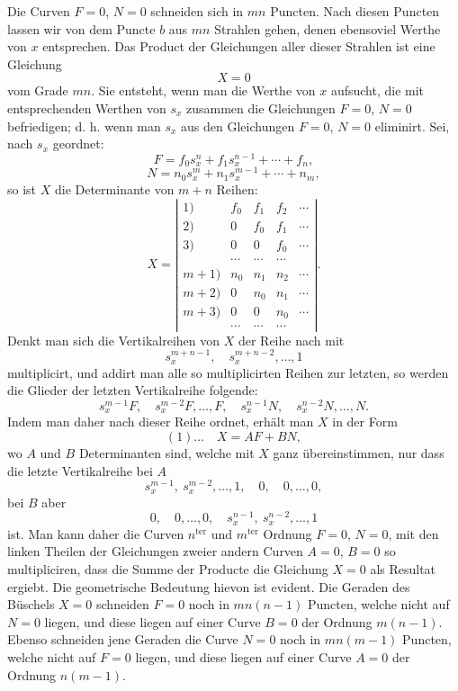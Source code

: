 \documentclass[10pt]{article}
\begin{document}
Die Curven $F=0$, $N=0$ schneiden sich in $mn$ Puncten. Nach diesen Puncten lassen wir von dem Puncte $b$ aus $mn$ Strahlen gehen, denen ebensoviel Werthe von $x$ entsprechen. Das Product der Gleichungen aller dieser Strahlen ist eine Gleichung
\[
X=0
\]
vom Grade $mn$. Sie entsteht, wenn man die Werthe von $x$ aufsucht, die mit entsprechenden Werthen von $s_x$ zusammen die Gleichungen $F=0$, $N=0$ befriedigen; d. h. wenn man $s_x$ aus den Gleichungen $F=0$, $N=0$ eliminirt. Sei, nach $s_x$ geordnet:
\[
F=f_0s_x^n+f_1s_x^{n-1}+\cdots+f_n,
\]
\[
N=n_0s_x^m+n_1s_x^{m-1}+\cdots+n_m,
\]
so ist $X$ die Determinante von $m+n$ Reihen:
\[
X=\left|\begin{array}{r|cccc}
1)&f_0&f_1&f_2&\cdots\\
2)&0&f_0&f_1&\cdots\\
3)&0&0&f_0&\cdots\\
&\cdots&\cdots&\cdots&\\
m+1)&n_0&n_1&n_2&\cdots\\
m+2)&0&n_0&n_1&\cdots\\
m+3)&0&0&n_0&\cdots\\
&\cdots&\cdots&\cdots&
\end{array}\right|.
\]
Denkt man sich die Vertikalreihen von $X$ der Reihe nach mit
\[
s_x^{m+n-1},\quad s_x^{m+n-2},\ldots,1
\]
multiplicirt, und addirt man alle so multiplicirten Reihen zur letzten, so werden die Glieder der letzten Vertikalreihe folgende:
\[
s_x^{m-1}F,\quad s_x^{m-2}F,\ldots,F,\quad s_x^{n-1}N,\quad s_x^{n-2}N,\ldots,N.
\]
Indem man daher nach dieser Reihe ordnet, erhält man $X$ in der Form
\[
(1)\ldots\quad X=AF+BN,
\]
wo $A$ und $B$ Determinanten sind, welche mit $X$ ganz übereinstimmen, nur dass die letzte Vertikalreihe bei $A$
\[
s_x^{m-1},\ s_x^{m-2},\ldots,1,\quad 0,\quad 0,\ldots,0,
\]
bei $B$ aber
\[
0,\quad 0,\ldots,0,\quad s_x^{n-1},\ s_x^{n-2},\ldots,1
\]
ist. Man kann daher die Curven $n^{\mathrm{ter}}$ und $m^{\mathrm{ter}}$ Ordnung $F=0$, $N=0$, mit den linken Theilen der Gleichungen zweier andern Curven $A=0$, $B=0$ so multipliciren, dass die Summe der Producte die Gleichung $X=0$ als Resultat ergiebt. Die geometrische Bedeutung hievon ist evident. Die Geraden des Büschels $X=0$ schneiden $F=0$ noch in $mn(n-1)$ Puncten, welche nicht auf $N=0$ liegen, und diese liegen auf einer Curve $B=0$ der Ordnung $m(n-1)$. Ebenso schneiden jene Geraden die Curve $N=0$ noch in $mn(m-1)$ Puncten, welche nicht auf $F=0$ liegen, und diese liegen auf einer Curve $A=0$ der Ordnung $n(m-1)$.
\end{document}
